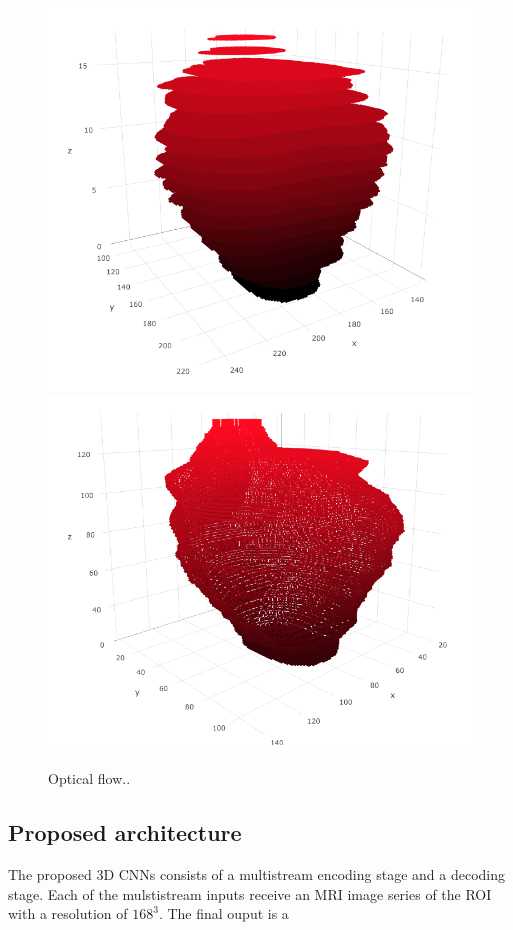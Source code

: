 \begin{figure}[h]
    \centering
    \includegraphics[totalheight=.15\textheight]{imgs/methodology/OF_1.png}
    \includegraphics[totalheight=.15\textheight]{imgs/methodology/OF_2.png}
    \caption{Optical flow..}
    \label{fig:of1}
\end{figure}

\subsection{Proposed architecture}
The proposed 3D CNNs consists of a multistream encoding stage and a decoding stage. Each
of the mulstistream inputs receive an MRI image series of the ROI with a resolution of
$168^3$. The final ouput is a 

